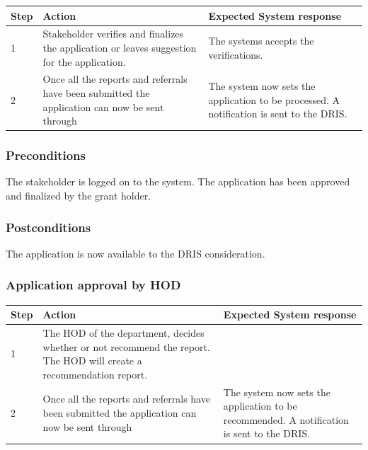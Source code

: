 \documentclass[12pt]{article}
\begin{document}
\begin{center}
\begin{tabular}{|l|p{6cm}|p{8cm}|}
\hline
Step & Action & Expected System response \\
\hline
1 & Stakeholder verifies and finalizes the application or leaves suggestion for the application. & The systems accepts the verifications. \\
\hline
2 & Once all the reports and referrals have been submitted the application can now be sent through  & The system now sets the application to be processed. A notification is sent to the DRIS. \\
\hline
\end{tabular}
\end{center}

\subsubsection*{Preconditions}
The stakeholder is logged on to the system. The application has been approved and finalized by the grant holder.

\subsubsection*{Postconditions}
The application is now available to the DRIS consideration.

\subsubsection{Application approval by HOD}

\begin{center}
\begin{tabular}{|l|p{6cm}|p{8cm}|}
\hline
Step & Action & Expected System response \\
\hline
1 & The HOD of the department, decides whether or not recommend the report. The HOD will create a recommendation report. \\
\hline
2 & Once all the reports and referrals have been submitted the application can now be sent through  & The system now sets the application to be recommended. A notification is sent to the DRIS. \\
\hline
\end{tabular}
\end{center}
\end{document}
